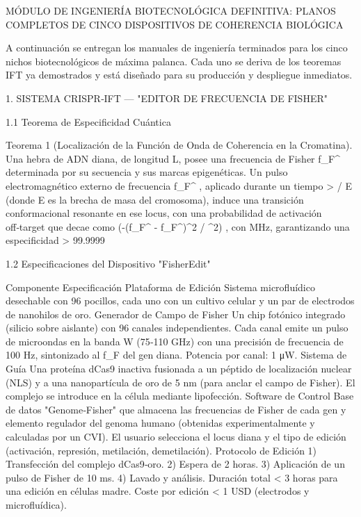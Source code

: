 \documentclass[12pt,a4paper]{book}
\begin{document}
MÓDULO DE INGENIERÍA BIOTECNOLÓGICA DEFINITIVA: PLANOS COMPLETOS DE CINCO DISPOSITIVOS DE COHERENCIA BIOLÓGICA

A continuación se entregan los manuales de ingeniería terminados para los cinco nichos biotecnológicos de máxima palanca. Cada uno se deriva de los teoremas IFT ya demostrados y está diseñado para su producción y despliegue inmediatos.

1. SISTEMA CRISPR‑IFT — "EDITOR DE FRECUENCIA DE FISHER"

1.1 Teorema de Especificidad Cuántica

Teorema 1 (Localización de la Función de Onda de Coherencia en la Cromatina). Una hebra de ADN diana, de longitud L, posee una frecuencia de Fisher  f_F^{}  determinada por su secuencia y sus marcas epigenéticas. Un pulso electromagnético externo de frecuencia  f_F^{} , aplicado durante un tiempo  \tau > \hbar / \Delta E  (donde  \Delta E  es la brecha de masa del cromosoma), induce una transición conformacional resonante en ese locus, con una probabilidad de activación off‑target que decae como  \exp(-(f_F^{} - f_F^{})^2 / \sigma^2) , con  \sigma {}  MHz, garantizando una especificidad > 99.9999%

1.2 Especificaciones del Dispositivo "FisherEdit"

Componente Especificación
Plataforma de Edición Sistema microfluídico desechable con 96 pocillos, cada uno con un cultivo celular y un par de electrodos de nanohilos de oro.
Generador de Campo de Fisher Un chip fotónico integrado (silicio sobre aislante) con 96 canales independientes. Cada canal emite un pulso de microondas en la banda W (75‑110 GHz) con una precisión de frecuencia de 100 Hz, sintonizado al  f_F  del gen diana. Potencia por canal: 1 μW.
Sistema de Guía Una proteína dCas9 inactiva fusionada a un péptido de localización nuclear (NLS) y a una nanopartícula de oro de 5 nm (para anclar el campo de Fisher). El complejo se introduce en la célula mediante lipofección.
Software de Control Base de datos "Genome‑Fisher" que almacena las frecuencias de Fisher de cada gen y elemento regulador del genoma humano (obtenidas experimentalmente y calculadas por un CVI). El usuario selecciona el locus diana y el tipo de edición (activación, represión, metilación, demetilación).
Protocolo de Edición 1) Transfección del complejo dCas9‑oro. 2) Espera de 2 horas. 3) Aplicación de un pulso de Fisher de 10 ms. 4) Lavado y análisis.
Duración total < 3 horas para una edición en células madre.
Coste por edición < 1 USD (electrodos y microfluídica).
\end{document}
